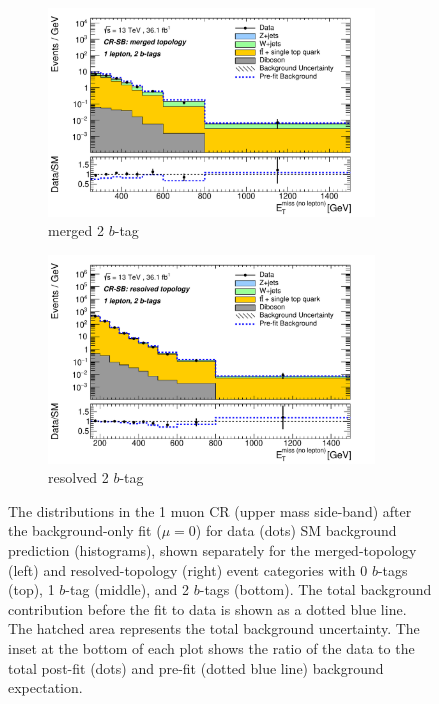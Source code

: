 \begin{figure}[htbp]
\begin{subfigure}{0.45\textwidth}
    \centering
    \includegraphics[width=0.95\textwidth]{figures/monoV/postfit/monoV_1lep_2tag_merged_massFail_met_XS.pdf}
    \caption{merged 2 \(b\)-tag}
  \end{subfigure}
    \begin{subfigure}{0.45\textwidth}
    \centering
    \includegraphics[width=0.95\textwidth]{figures/monoV/postfit/monoV_1lep_2tag_resolved_massFail_met_XS.pdf}
    \caption{resolved 2 \(b\)-tag}
  \end{subfigure}
  \caption{The \metnolep distributions in the 1 muon CR (upper mass side-band) after the background-only fit (\(\mu=0\)) for data (dots) SM background prediction (histograms), shown separately for the merged-topology (left) and resolved-topology (right) event categories with 0 \(b\)-tags (top), 1 \(b\)-tag (middle), and 2 \(b\)-tags (bottom). The total background contribution before the fit to data is shown as a dotted blue line. The hatched area represents the total background uncertainty. The inset at the bottom of each plot shows the ratio of the data to the total post-fit (dots) and pre-fit (dotted blue line) background expectation.}
  \label{fig:appendix:monoV:postfit:cr1}
\end{figure}

